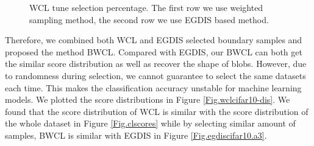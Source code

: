 \begin{figure}[H]
\setcounter{subfigure}{0}
\caption{WCL tune selection percentage. The first row we use weighted sampling method, the second row we use EGDIS based method.}
\label{Fig.wclcifar10}
\end{figure}

Therefore, we combined both WCL and EGDIS selected boundary samples and proposed the method BWCL. Compared with EGDIS, our BWCL can both get the similar score distribution as well as recover the shape of blobs. However, due to randomness during selection, we cannot guarantee to select the same datasets each time. This makes the classification accuracy unstable for machine learning models. We plotted the score distributions in Figure \ref{Fig.wclcifar10-dis}. We found that the score distribution of WCL is similar with the score distribution of the whole dataset in Figure \ref{Fig.clscores} while by selecting similar amount of samples, BWCL is similar with EGDIS in Figure \ref{Fig.egdiscifar10.a3}.

